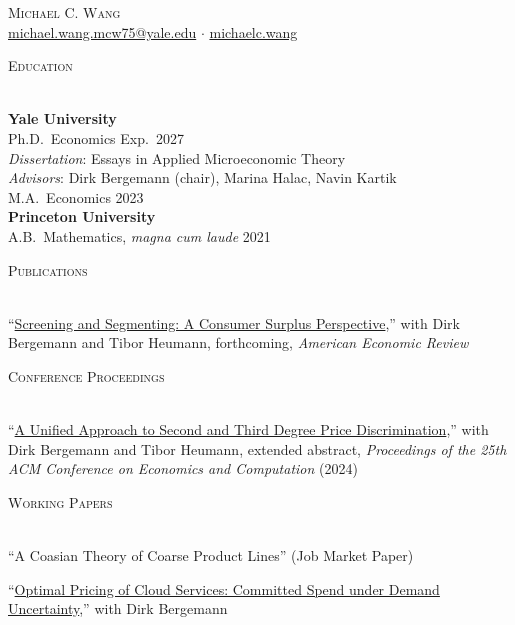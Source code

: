 \documentclass[letterpaper,11pt]{article}
\makeatletter
\newcommand{\lineunder} {
    \vspace*{-4pt} \\
	\hrulefill \\
	\vspace{-2pt}
}
\newcommand{\cvindent}{2em}
\newcommand{\pubsep}{1.5mm}
\newcommand{\pub}[1]{%
    \par\noindent #1\par\vspace{\pubsep}
}
\newcommand{\header} [1] {
    {\vspace*{6pt} \large{\textsc{#1}}}
    \vspace*{-6pt} \lineunder
}
\newcommand{\pagehead} {
	\begin{center}
		{\Huge \textsc{Michael C. Wang}} \\[1.5mm]
		\href{mailto:michael.wang.mcw75@yale.edu}{michael.wang.mcw75@yale.edu} $\cdot$ \href{https://michaelc.wang}{michaelc.wang} \\
		\vspace*{3mm}
	\end{center}
}
\makeatother
\begin{document}

\pagehead


\header{Education}

\textbf{Yale University} \\
Ph.D.\ Economics \hfill Exp.\ 2027 \\
\hspace{\cvindent}\textit{Dissertation}: Essays in Applied Microeconomic Theory \\
\hspace{\cvindent}\textit{Advisors}: Dirk Bergemann (chair), Marina Halac, Navin Kartik \\[1.5mm]
M.A.\ Economics \hfill 2023 \\[3mm]

\textbf{Princeton University} \\
A.B.\ Mathematics, \textit{magna cum laude} \hfill 2021

\vspace{3mm}


\header{Publications}

\pub{``\href{https://www.aeaweb.org/articles?id=10.1257/aer.20250206}{Screening and Segmenting: A Consumer Surplus Perspective},'' with Dirk Bergemann and Tibor Heumann, forthcoming, \textit{American Economic Review}}

\vspace{2.5mm}


\header{Conference Proceedings}

\pub{``\href{https://dl.acm.org/doi/10.1145/3670865.3673626}{A Unified Approach to Second and Third Degree Price Discrimination},'' with Dirk Bergemann and Tibor Heumann, extended abstract, \textit{Proceedings of the 25th ACM Conference on Economics and Computation} (2024)}

\vspace{2.5mm}


\header{Working Papers}

\pub{``A Coasian Theory of Coarse Product Lines'' (Job Market Paper)}

\pub{``\href{https://arxiv.org/abs/2502.08022}{Optimal Pricing of Cloud Services: Committed Spend under Demand Uncertainty},'' with Dirk Bergemann}
\end{document}
